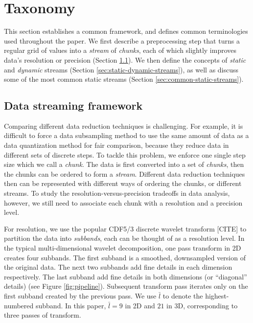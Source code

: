 \section{Taxonomy}
\label{sec:terminologies}

This section establishes a common framework, and defines common terminologies used throughout the
paper. We first describe a preprocessing step that turns a regular grid of values into a
\emph{stream} of \emph{chunks}, each of which slightly improves data's resolution or precision
(Section \ref{sec:raw-to-stream}). We then define the concepts of \emph{static} and \emph{dynamic}
streams (Section \ref{sec:static-dynamic-streams}), as well as discuss some of the most common
static streams (Section \ref{sec:common-static-streams}).

\subsection{Data streaming framework}
\label{sec:raw-to-stream}

Comparing different data reduction techniques is challenging. For example, it is difficult to force
a data subsampling method to use the same amount of data as a data quantization method for fair
comparison, because they reduce data in different sets of discrete steps. To tackle this problem, we
enforce one single step size which we call a \emph{chunk}. The data is first converted into a set of
\emph{chunks}, then the chunks can be ordered to form a \emph{stream}. Different data reduction
techniques then can be represented with different ways of ordering the chunks, or different streams.
To study the resolution-versus-precision tradeoffs in data analysis, however, we still need to
associate each chunk with a resolution and a precision level.

For resolution, we use the popular CDF5/3 discrete wavelet transform [CITE] to partition the data
into \emph{subbands}, each can be thought of as a resolution level. In the typical multi-dimensional
wavelet decomposition, one pass transform in 2D creates four subbands. The first subband is a
smoothed, downsampled version of the original data. The next two subbands add fine details in each
dimension respectively. The last subband add fine details in both dimensions (or ``diagonal''
details) (see Figure \ref{fig:pipeline}). Subsequent transform pass iterates only on the first
subband created by the previous pass. We use $\bar{l}$ to denote the highest-numbered subband. In
this paper, $\bar{l}=9$ in 2D and $21$ in 3D, corresponding to three passes of transform.

